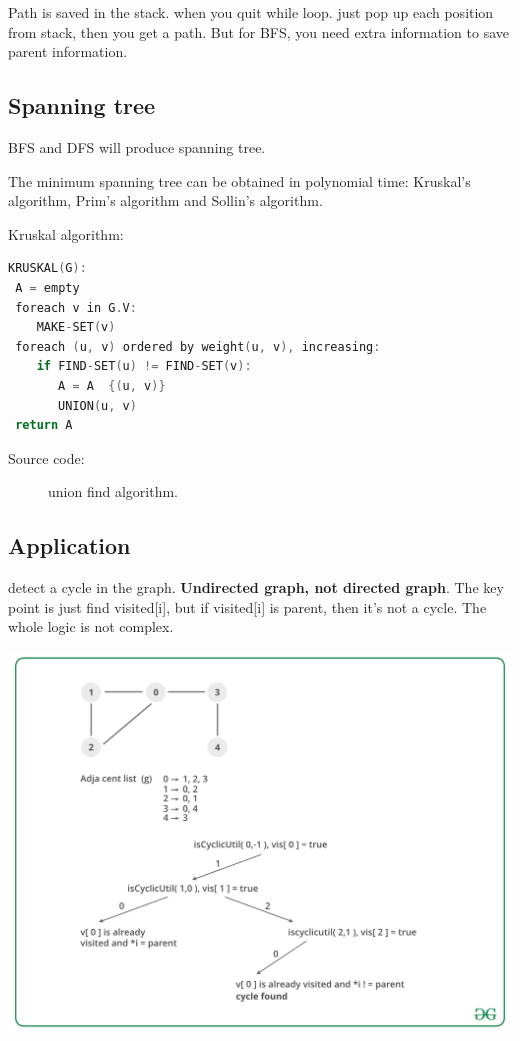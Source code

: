 \documentclass[a4paper,11pt,twoside]{book}
\begin{document}
	\par Path is saved in the stack.  when you quit while loop. just pop up each position from stack, then you get a path. But for BFS, you need extra information to save parent information. 


\subsection{Spanning tree}

	\par 	BFS and DFS will produce spanning tree. 
	\par The minimum spanning tree can be obtained in polynomial time: Kruskal's algorithm, Prim's algorithm and Sollin's algorithm.


	\par Kruskal algorithm:
\begin{lstlisting}[frame=single, language=c++]
KRUSKAL(G):
 A = empty
 foreach v in G.V:
    MAKE-SET(v)
 foreach (u, v) ordered by weight(u, v), increasing:
    if FIND-SET(u) != FIND-SET(v):
       A = A  {(u, v)}
       UNION(u, v)
 return A
\end{lstlisting}
\begin{description}
	\item[Source code:] union find algorithm.
\end{description}


\subsection{Application}

	\par detect a cycle in the graph. \textbf{Undirected graph, not directed graph}.  The key point is just find visited[i], but if visited[i] is parent, then it's not a cycle. The whole logic is not complex. 

\begin{center}
	\includegraphics[width=0.7\linewidth]{pics/dc.png}
\end{center}
\end{document}
